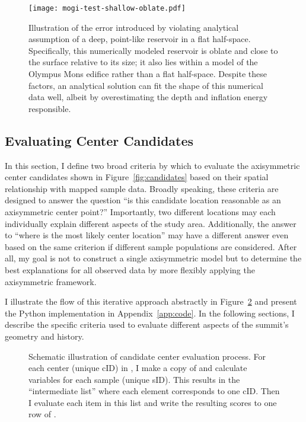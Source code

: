 \begin{figure}
    \texttt{[image: mogi-test-shallow-oblate.pdf]}%
    \caption[Analytical model sensitivity to reservoir geometry]{Illustration of the error introduced by violating analytical assumption of a deep, point-like reservoir in a flat half-space. Specifically, this numerically modeled reservoir is oblate and close to the surface relative to its size; it also lies within a model of the Olympus Mons edifice rather than a flat half-space. Despite these factors, an analytical solution can fit the shape of this numerical data well, albeit by overestimating the depth and inflation energy responsible.}%
    \label{fig:mogi-test-shallow-oblate}
\end{figure}

\subsection{Evaluating Center Candidates}

In this section, I define two broad criteria by which to evaluate the axisymmetric center candidates shown in Figure~\ref{fig:candidates} based on their spatial relationship with mapped sample data. Broadly speaking, these criteria are designed to answer the question ``is this candidate location reasonable as an axisymmetric center point?'' Importantly, two different locations may each individually explain different aspects of the study area. Additionally, the answer to ``where is the most likely center location'' may have a different answer even based on the same criterion if different sample populations are considered. After all, my goal is not to construct a single axisymmetric model but to determine the best explanations for all observed data by more flexibly applying the axisymmetric framework.

I illustrate the flow of this iterative approach abstractly in Figure~\ref{fig:eval-model} and present the Python implementation in Appendix~\ref{app:code}. In the following sections, I describe the specific criteria used to evaluate different aspects of the summit's geometry and history.

\begin{figure}
    \caption[Center evaluation workflow]{Schematic illustration of candidate center evaluation process. For each center (unique cID) in , I make a copy of  and calculate variables for each sample (unique sID). This results in the ``intermediate list'' where each element corresponds to one cID. Then I evaluate each item in this list and write the resulting scores to one row of .}%
    \label{fig:eval-model}
\end{figure}

